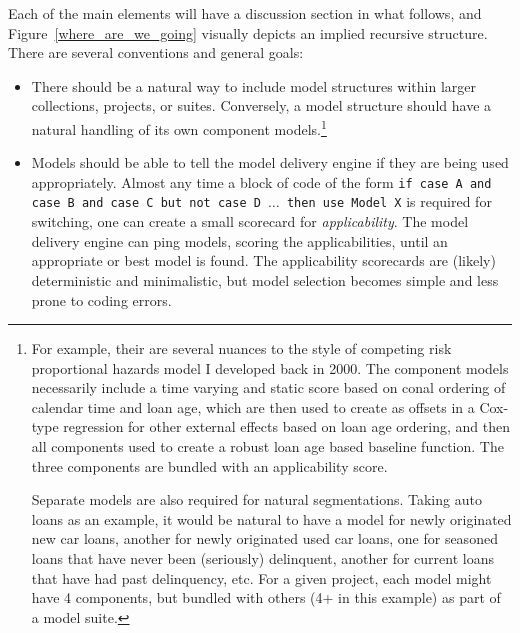 \documentclass[10pt]{article}
\begin{document}
Each of the main elements will have a discussion section in what follows, and Figure~\ref{where_are_we_going} visually depicts 
an implied recursive structure.  There are several conventions and general goals:

\begin{itemize}[label=-,noitemsep,topsep=0pt]

    \item There should be a natural way to include model structures within larger collections, projects, or suites.  Conversely, a model
        structure should have a natural handling of its own component models.\ifcommentary\footnote{ For example, their are several nuances
                to the style of competing risk proportional hazards model I developed back in 2000.  The component models necessarily include
                a time varying and static score based on conal ordering of calendar time and loan age, which are then used to create as
                offsets in a Cox-type regression for other external effects based on loan age ordering, and then all components used to
                create a robust loan age based baseline function. The three components are bundled with an applicability score.  

            Separate models are also required for natural segmentations.  Taking auto loans as an example, it would be natural to have a
                model for newly originated new car loans, another for newly originated used car loans, one for seasoned loans that have
                never been (seriously) delinquent, another for current loans that have had past delinquency, etc.  For a given project, each
                model might have 4 components, but bundled with others (4+ in this example) as part of a model suite.}\fi

    \item Models should be able to tell the model delivery engine if they are being used appropriately.
        Almost any time a block of code of the form {\tt if case A and case B and case C but not case D $\ldots$ then use Model X}
        is required for switching, one can create a small scorecard for {\em applicability}.  The model delivery engine can ping 
        models, scoring the applicabilities, until an appropriate or best model is found.  
                The applicability scorecards are (likely) deterministic and minimalistic, but model selection becomes simple and 
                less prone to coding errors.


\end{itemize}
\end{document}
